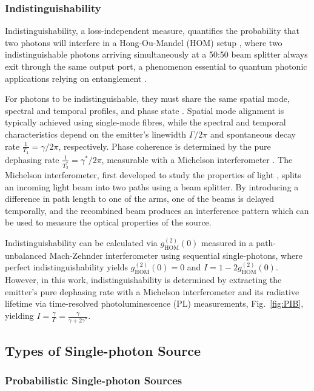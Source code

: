 \subsubsection{Indistinguishability}

Indistinguishability, a loss-independent measure, quantifies the probability that two photons will interfere in a Hong-Ou-Mandel (HOM) setup \cite{Hong1987}, where two indistinguishable photons arriving simultaneously at a 50:50 beam splitter always exit through the same output port, a phenomenon essential to quantum photonic applications relying on entanglement \cite{Kok2007, Knill2001}.

For photons to be indistinguishable, they must share the same spatial mode, spectral and temporal profiles, and phase state \cite{Senellart2017}. Spatial mode alignment is typically achieved using single-mode fibres, while the spectral and temporal characteristics depend on the emitter’s linewidth $\Gamma/2\pi$ and spontaneous decay rate $\frac{1}{T_1}=\gamma/2\pi$, respectively. Phase coherence is determined by the pure dephasing rate $\frac{1}{T_2^*}=\gamma^*/2\pi$, measurable with a Michelson interferometer \cite{Michelson1887, Jelezko2003}. The Michelson interferometer, first developed to study the properties of light \cite{Michelson1887}, splits an incoming light beam into two paths using a beam splitter. By introducing a difference in path length to one of the arms, one of the beams is delayed temporally, and the recombined beam produces an interference pattern which can be used to measure the optical properties of the source.

Indistinguishability can be calculated via $g^{(2)}_{\text{HOM}}(0)$ measured in a path-unbalanced Mach-Zehnder interferometer using sequential single-photons, where perfect indistinguishability yields $g^{(2)}_{\text{HOM}}(0)=0$ and $I=1-2g^{(2)}_{\text{HOM}}(0)$. However, in this work, indistinguishability is determined by extracting the emitter’s pure dephasing rate with a Michelson interferometer and its radiative lifetime via time-resolved photoluminescence (PL) measurements, Fig.~\ref{fig:PIB}, yielding $I=\frac{\gamma}{\Gamma}=\frac{\gamma}{\gamma+2\gamma^*}$.

\subsection{Types of Single-photon Source}

\subsubsection{Probabilistic Single-photon Sources \label{sec:prob-sources}}

